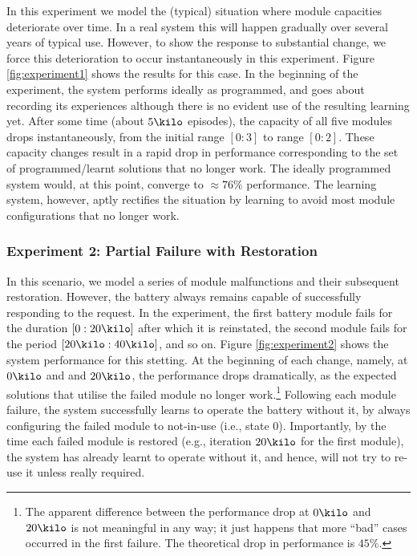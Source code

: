 In this experiment we model the (typical) situation where module capacities deteriorate over time. In a real system this will happen gradually over several years of typical use. However, to show the response to substantial change, we force this deterioration to occur instantaneously in this experiment. 
Figure \ref{fig:experiment1} shows the results for this case. In the beginning of the experiment, the system performs ideally as programmed, and goes about recording its experiences although there is no evident use of the resulting learning yet. After some time (about $5\kilo$ episodes), the capacity of all five modules drops instantaneously, from the initial range $[0:3]$ to range $[0:2]$. 
These capacity changes result in a rapid drop in performance corresponding to the set of programmed/learnt solutions that no longer work. The ideally programmed system would, at this point, converge to $\approx 76\%$ performance. The learning system, however, aptly rectifies the situation by learning to avoid most module configurations that no longer work. 


%


\subsubsection{Experiment 2: Partial Failure with Restoration}

In this scenario, we model a series of module malfunctions and their subsequent restoration. However, the battery always remains capable of successfully responding to the request.
In the experiment, the first battery module fails for the duration $[0:20\kilo]$ after which it is reinstated, the second module fails for the period $[20\kilo:40\kilo]$, and so on. 
Figure \ref{fig:experiment2} shows the system performance for this stetting. At the beginning of each change, namely, at $0\kilo$ and and $20\kilo$, the performance drops dramatically, as the expected solutions that utilise the failed module no longer work.\footnote{The apparent difference between the  performance drop at $0\kilo$ and $20\kilo$ is not meaningful in any way; it just happens that more ``bad'' cases occurred in the  first failure. The theoretical drop in performance is $45\%$.} 
Following each module failure, the system successfully learns to operate the battery without it, by always configuring the failed module to not-in-use (i.e., state $0$). Importantly, by the time each failed module is restored (e.g., iteration $20\kilo$ for the first module), the system has already learnt to operate without it, and hence, will not try to re-use it unless really required.


